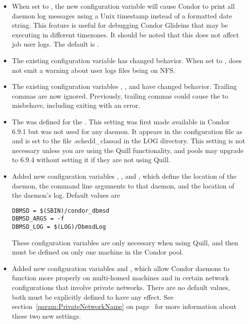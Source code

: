 \begin{itemize}

\item When set to , the new configuration variable
 will cause Condor to print all daemon
log messages using a Unix timestamp instead of a formatted date
string. This feature is useful for debugging Condor Glideins that may
be executing in different timezones. It should be noted that this does
not affect job user logs. The default is .

\item The existing configuration variable  has 
changed behavior. When set to ,
 does not emit a warning about user logs files being on NFS.

\item The existing 
configuration variables ,
, and  
have changed behavior.
Trailing commas are now ignored.
Previously, trailing commas could cause the  to misbehave,
including exiting with an error.

\item The  was defined for the .
This setting was first made available in Condor 6.9.1 but was not used for
any daemon.  
It appears in the configuration file as  and
is set to the file .schedd\_classad in the LOG directory. This setting is 
not necessary unless you are using the Quill functionality, and pools may 
upgrade to 6.9.4 without setting it if they are not using Quill. 
  
\item Added new configuration variables
, , and ,
which define the location of the  daemon,
the command line arguments to that daemon,
and the location of the daemon's log.
Default values are
\begin{verbatim}
DBMSD = $(SBIN)/condor_dbmsd
DBMSD_ARGS = -f
DBMSD_LOG = $(LOG)/DbmsdLog
\end{verbatim}
These configuration variables are only necessary when using Quill,
and then must be defined on only one machine in the Condor pool.

\item Added new configuration variables
 and
,
which allow Condor daemons to function more properly on multi-homed
machines and in certain network configurations that involve private
networks.
There are no default values, both must be explicitly defined to have
any effect.
See section~\ref{param:PrivateNetworkName} on
page~\pageref{param:PrivateNetworkName} for more information about
these two new settings.

\end{itemize}


